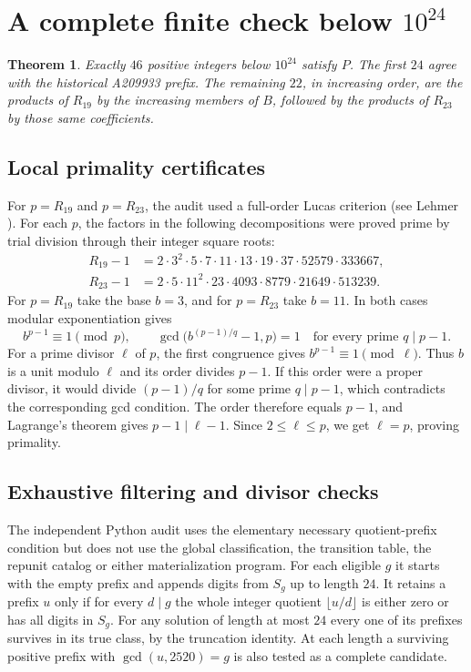 \documentclass[11pt]{article}
\newtheorem{theorem}{Theorem}
\begin{document}
\section{A complete finite check below \texorpdfstring{\(10^{24}\)}{10 to the 24th power}}\label{sec:finite}

\begin{theorem}\label{thm:finite}
Exactly \(46\) positive integers below \(10^{24}\) satisfy \(P\).
The first \(24\) agree with the historical A209933 prefix.
The remaining \(22\), in increasing order, are the products of \(R_{19}\)
by the increasing members of \(B\), followed by the products of
\(R_{23}\) by those same coefficients.
\end{theorem}

\subsection{Local primality certificates}

For \(p=R_{19}\) and \(p=R_{23}\), the audit used a full-order
Lucas criterion (see Lehmer \cite{lehmer}). For each \(p\), the
factors in the following decompositions were proved prime by trial
division through their integer square roots:
\begin{align*}
 R_{19}-1
   &=2\cdot3^2\cdot5\cdot7\cdot11\cdot13\cdot19\cdot37
     \cdot52579\cdot333667,\\
 R_{23}-1
   &=2\cdot5\cdot11^2\cdot23\cdot4093\cdot8779
     \cdot21649\cdot513239 .
\end{align*}
For \(p=R_{19}\) take the base \(b=3\), and for \(p=R_{23}\) take
\(b=11\). In both cases modular exponentiation gives
\[
 b^{p-1}\equiv1\pmod p,\qquad
 \gcd\bigl(b^{(p-1)/q}-1,p\bigr)=1
       \quad\text{for every prime }q\mid p-1.
\]
For a prime divisor \(\ell\) of \(p\), the first congruence gives
\(b^{p-1}\equiv1\pmod\ell\). Thus \(b\) is a unit modulo \(\ell\)
and its order divides \(p-1\). If this order were a proper divisor,
it would divide \((p-1)/q\) for some prime \(q\mid p-1\), which
contradicts the corresponding gcd condition. The order therefore
equals \(p-1\), and Lagrange's theorem gives \(p-1\mid\ell-1\).
Since \(2\le\ell\le p\), we get \(\ell=p\), proving primality.

\subsection{Exhaustive filtering and divisor checks}

The independent Python audit uses the elementary necessary
quotient-prefix condition but does not use the global classification,
the transition table, the repunit catalog or either materialization
program. For each eligible \(g\) it starts with the empty prefix and
appends digits from \(S_g\) up to length \(24\). It retains a prefix
\(u\) only if for every \(d\mid g\) the whole integer quotient
\(\lfloor u/d\rfloor\) is either zero or has all digits in \(S_g\).
For any solution of length at most \(24\) every one of its prefixes
survives in its true class, by the truncation identity. At each
length a surviving positive prefix with \(\gcd(u,2520)=g\) is also
tested as a complete candidate.
\end{document}
